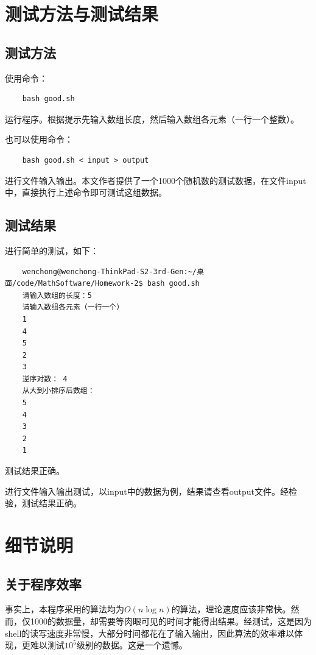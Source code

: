 \documentclass[UTF8]{ctexart}
\begin{document}
\section{测试方法与测试结果}

\subsection{测试方法}

使用命令：

\begin{verbatim}
    bash good.sh
\end{verbatim}

运行程序。根据提示先输入数组长度，然后输入数组各元素（一行一个整数）。

也可以使用命令：

\begin{verbatim}
    bash good.sh < input > output
\end{verbatim}

进行文件输入输出。本文作者提供了一个1000个随机数的测试数据，在文件input中，直接执行上述命令即可测试这组数据。

\subsection{测试结果}

进行简单的测试，如下：

\begin{verbatim}
    wenchong@wenchong-ThinkPad-S2-3rd-Gen:~/桌面/code/MathSoftware/Homework-2$ bash good.sh
    请输入数组的长度：5
    请输入数组各元素（一行一个）
    1
    4
    5
    2
    3
    逆序对数： 4
    从大到小排序后数组：
    5
    4
    3
    2
    1
\end{verbatim}

测试结果正确。

进行文件输入输出测试，以input中的数据为例，结果请查看output文件。经检验，测试结果正确。

\section{细节说明}

\subsection{关于程序效率}

事实上，本程序采用的算法均为$O(n\log n)$的算法，理论速度应该非常快。然而，仅1000的数据量，却需要等肉眼可见的时间才能得出结果。经测试，这是因为shell的读写速度非常慢，大部分时间都花在了输入输出，因此算法的效率难以体现，更难以测试$10^5$级别的数据。这是一个遗憾。
\end{document}
